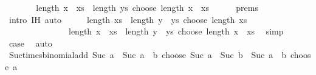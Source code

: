 \begin{isabellebody}
\ \ \isamarkupfalse%
\ \isamarkupfalse%
\ {\isachardoublequoteopen}{\isasymdots}\ {\isacharequal}{\kern0pt}\ {\isacharparenleft}{\kern0pt}length\ {\isacharparenleft}{\kern0pt}x\ {\isacharhash}{\kern0pt}\ xs{\isacharparenright}{\kern0pt}\ {\isacharplus}{\kern0pt}\ length\ ys{\isacharparenright}{\kern0pt}\ choose\ length\ {\isacharparenleft}{\kern0pt}x\ {\isacharhash}{\kern0pt}\ xs{\isacharparenright}{\kern0pt}{\isachardoublequoteclose}\isanewline
\ \ \ \ \isamarkupfalse%
\ {\isachardoublequoteopen}{}{\isachardot}{\kern0pt}prems{\isachardoublequoteclose}\ \isamarkupfalse%
\ {\isacharparenleft}{\kern0pt}intro\ {\isachardoublequoteopen}{}{\isachardot}{\kern0pt}IH{\isachardoublequoteclose}{\isacharparenright}{\kern0pt}\ auto\isanewline
\ \ \isamarkupfalse%
\ \isamarkupfalse%
\ {\isachardoublequoteopen}length\ xs\ {\isacharplus}{\kern0pt}\ length\ {\isacharparenleft}{\kern0pt}y\ {\isacharhash}{\kern0pt}\ ys{\isacharparenright}{\kern0pt}\ choose\ length\ xs\ {\isacharplus}{\kern0pt}\ {\isasymdots}\ {\isacharequal}{\kern0pt}\isanewline
\ \ \ \ \ \ \ \ \ \ \ \ \ \ \ {\isacharparenleft}{\kern0pt}length\ {\isacharparenleft}{\kern0pt}x\ {\isacharhash}{\kern0pt}\ xs{\isacharparenright}{\kern0pt}\ {\isacharplus}{\kern0pt}\ length\ {\isacharparenleft}{\kern0pt}y\ {\isacharhash}{\kern0pt}\ ys{\isacharparenright}{\kern0pt}{\isacharparenright}{\kern0pt}\ choose\ length\ {\isacharparenleft}{\kern0pt}x\ {\isacharhash}{\kern0pt}\ xs{\isacharparenright}{\kern0pt}{\isachardoublequoteclose}\ \isamarkupfalse%
\ simp\isanewline
\ \ \isamarkupfalse%
\ \isamarkupfalse%
\ {\isacharquery}{\kern0pt}case\ \isacommand{{\isachardot}{\kern0pt}}\isamarkupfalse%
\isanewline
{}\isamarkupfalse%
\ auto%
\endisatagproof
{\isafoldproof}%
%
\isadelimproof
\isanewline
%
\endisadelimproof
\isanewline
{}\isamarkupfalse%
\ Suc{\isacharunderscore}{\kern0pt}times{\isacharunderscore}{\kern0pt}binomial{\isacharunderscore}{\kern0pt}add{\isacharcolon}{\kern0pt}\ {\isachardoublequoteopen}Suc\ a\ {\isacharasterisk}{\kern0pt}\ {\isacharparenleft}{\kern0pt}Suc\ {\isacharparenleft}{\kern0pt}a\ {\isacharplus}{\kern0pt}\ b{\isacharparenright}{\kern0pt}\ choose\ Suc\ a{\isacharparenright}{\kern0pt}\ {\isacharequal}{\kern0pt}\ Suc\ b\ {\isacharasterisk}{\kern0pt}\ {\isacharparenleft}{\kern0pt}Suc\ {\isacharparenleft}{\kern0pt}a\ {\isacharplus}{\kern0pt}\ b{\isacharparenright}{\kern0pt}\ choose\ a{\isacharparenright}{\kern0pt}{\isachardoublequoteclose}\isanewline

\end{isabellebody}
